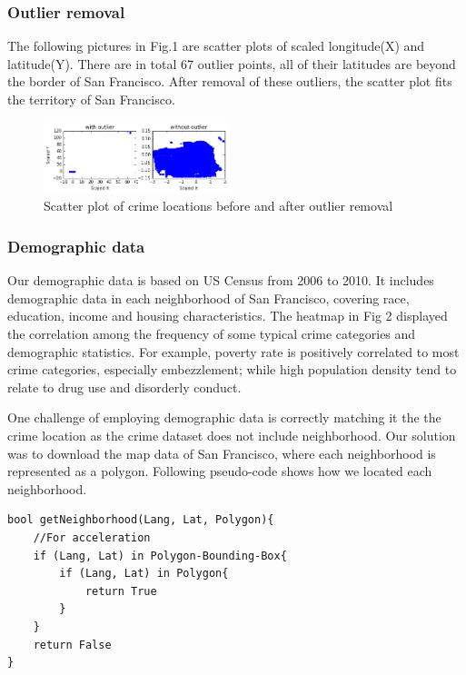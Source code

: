 \documentclass[11pt,conference]{IEEEtran}
\begin{document}
\subsubsection{Outlier removal}
The following pictures in Fig.1 are scatter plots of scaled longitude(X) and latitude(Y). There are in total 67 outlier points, all of their latitudes are beyond the border of San Francisco. After removal of these outliers, the scatter plot fits the territory of San Francisco.
\begin{figure}[H]
\begin{center}
\includegraphics [width=0.48\textwidth]{pics/outliers.png}
\caption{Scatter plot of crime locations before and after outlier removal}
\end{center}
\end{figure}

\subsubsection{Demographic data}
Our demographic data is based on US Census from 2006 to 2010. It includes demographic data in each neighborhood of San Francisco, covering race, education, income and housing characteristics. The heatmap in Fig 2 displayed the correlation among the frequency of some typical crime categories and demographic statistics. For example, poverty rate is positively correlated to most crime categories, especially embezzlement; while high population density tend to relate to drug use and disorderly conduct.

One challenge of employing demographic data is correctly matching it the the crime location as the crime dataset does not include neighborhood. Our solution was to download the map data of San Francisco, where each neighborhood is represented as a polygon. Following pseudo-code shows how we located each neighborhood.
\begin{lstlisting}
bool getNeighborhood(Lang, Lat, Polygon){ 
	//For acceleration
	if (Lang, Lat) in Polygon-Bounding-Box{
		if (Lang, Lat) in Polygon{
			return True
		}
	}
	return False
}
\end{lstlisting}
\end{document}
